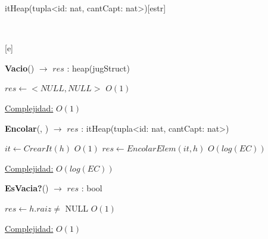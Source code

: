 \begin{Representacion}
 
  \begin{Estructura}{itHeap(tupla<id: nat, cantCapt: nat>)}[estr]
      \begin{Tupla}[estr]%
    \end{Tupla}
  \end{Estructura}


  ~

  [e]{}

\end{Representacion}



\begin{Algoritmos}
   
\begin{algorithm}[H]{\textbf{Vacio}() $\to$ $res$ : heap(jugStruct)}
    	\begin{algorithmic}[1]
			 \State $res \gets  <NULL, NULL> $ \Comment $O(1)$

			\medskip
			\Statex \underline{Complejidad:} $O(1)$
    	\end{algorithmic}
\end{algorithm}
   
\begin{algorithm}[H]{\textbf{Encolar}(, ) $\to$ $res$ : itHeap(tupla<id: nat, cantCapt: nat>)}
    	\begin{algorithmic}[1]
			 \State $it \gets  CrearIt(h) $ \Comment $O(1)$
			 \State $res \gets EncolarElem(it, h) $ \Comment $O(log(EC))$
			 

			\medskip
			\Statex \underline{Complejidad:} $O(log(EC))$
    	\end{algorithmic}
\end{algorithm}


\begin{algorithm}[H]{\textbf{EsVacia?}() $\to$ $res$ : bool}
    	\begin{algorithmic}[1]
			 \State $res \gets  h.raiz \not=$ NULL \Comment $O(1)$

			\medskip
			\Statex \underline{Complejidad:} $O(1)$
    	\end{algorithmic}
\end{algorithm}


\end{Algoritmos}
